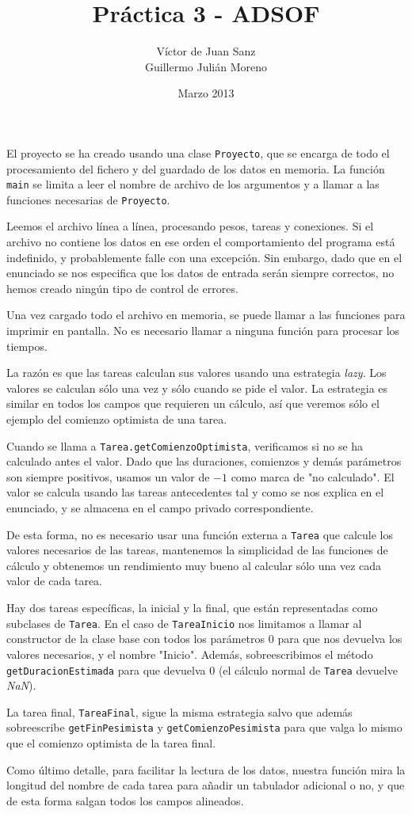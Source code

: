 \documentclass[12pt,a4paper]{article}
\author{Víctor de Juan Sanz \\ Guillermo Julián Moreno}
\date{Marzo 2013}
\title{Práctica 3 - ADSOF}
\begin{document}
\pagestyle{plain}
\maketitle

El proyecto se ha creado usando una clase \texttt{Proyecto}, que se encarga de todo el procesamiento del fichero y del guardado de los datos en memoria. La función \texttt{main} se limita a leer el nombre de archivo de los argumentos y a llamar a las funciones necesarias de \texttt{Proyecto}.

Leemos el archivo línea a línea, procesando pesos, tareas y conexiones. Si el archivo no contiene los datos en ese orden el comportamiento del programa está indefinido, y probablemente falle con una excepción. Sin embargo, dado que en el enunciado se nos especifica que los datos de entrada serán siempre correctos, no hemos creado ningún tipo de control de errores.

Una vez cargado todo el archivo en memoria, se puede llamar a las funciones para imprimir en pantalla. No es necesario llamar a ninguna función para procesar los tiempos.

La razón es que las tareas calculan sus valores usando una estrategia \textit{lazy}. Los valores se calculan sólo una vez y sólo cuando se pide el valor. La estrategia es similar en todos los campos que requieren un cálculo, así que veremos sólo el ejemplo del comienzo optimista de una tarea.

Cuando se llama a \texttt{Tarea.getComienzoOptimista}, verificamos si no se ha calculado antes el valor. Dado que las duraciones, comienzos y demás parámetros son siempre positivos, usamos un valor de $-1$ como marca de "no calculado". El valor se calcula usando las tareas antecedentes tal y como se nos explica en el enunciado, y se almacena en el campo privado correspondiente.

De esta forma, no es necesario usar una función externa a \texttt{Tarea} que calcule los valores necesarios de las tareas, mantenemos la simplicidad de las funciones de cálculo y obtenemos un rendimiento muy bueno al calcular sólo una vez cada valor de cada tarea.

Hay dos tareas específicas, la inicial y la final, que están representadas como subclases de \texttt{Tarea}. En el caso de \texttt{TareaInicio} nos limitamos a llamar al constructor de la clase base con todos los parámetros 0 para que nos devuelva los valores necesarios, y el nombre "Inicio". Además, sobreescribimos el método \texttt{getDuracionEstimada} para que devuelva 0 (el cálculo normal de \texttt{Tarea} devuelve \textit{NaN}).

La tarea final, \texttt{TareaFinal}, sigue la misma estrategia salvo que además sobreescribe \texttt{getFinPesimista} y \texttt{getComienzoPesimista} para que valga lo mismo que el comienzo optimista de la tarea final.

Como último detalle, para facilitar la lectura de los datos, nuestra función mira la longitud del nombre de cada tarea para añadir un tabulador adicional o no, y que de esta forma salgan todos los campos alineados.

\end{document}
